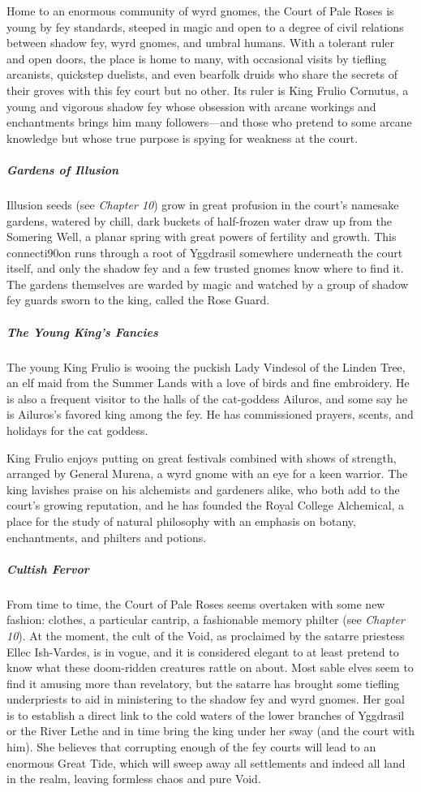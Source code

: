 \documentclass[10pt,a4paper,twoside,bg=print,twocolumn,openany,nodeprecatedcode]{dndbook}
\begin{document}
Home to an enormous community of wyrd gnomes, the Court of Pale Roses is young by fey standards, steeped in magic and open to a degree of civil relations between shadow fey, wyrd gnomes, and umbral humans. With a tolerant ruler and open doors, the place is home to many, with occasional visits by tiefling arcanists, quickstep duelists, and even bearfolk druids who share the secrets of their groves with this fey court but no other. Its ruler is King Frulio Cornutus, a young and vigorous shadow fey whose obsession with arcane workings and enchantments brings him many followers—and those who pretend to some arcane knowledge but whose true purpose is spying for weakness at the court.

\subparagraph{Gardens of Illusion}
Illusion seeds (see \textit{Chapter 10}) grow in great profusion in the court's namesake gardens, watered by chill, dark buckets of half-frozen water draw up from the Somering Well, a planar spring with great powers of fertility and growth. This connecti90on runs through a root of Yggdrasil somewhere underneath the court itself, and only the shadow fey and a few trusted gnomes know where to find it. The gardens themselves are warded by magic and watched by a group of shadow fey guards sworn to the king, called the Rose Guard.

\subparagraph{The Young King's Fancies}
The young King Frulio is wooing the puckish Lady Vindesol of the Linden Tree, an elf maid from the Summer Lands with a love of birds and fine embroidery. He is also a frequent visitor to the halls of the cat-goddess Ailuros, and some say he is Ailuros's favored king among the fey. He has commissioned prayers, scents, and holidays for the cat goddess.

King Frulio enjoys putting on great festivals combined with shows of strength, arranged by General Murena, a wyrd gnome with an eye for a keen warrior. The king lavishes praise on his alchemists and gardeners alike, who both add to the court's growing reputation, and he has founded the Royal College Alchemical, a place for the study of natural philosophy with an emphasis on botany, enchantments, and philters and potions.

\subparagraph{Cultish Fervor}
From time to time, the Court of Pale Roses seems overtaken with some new fashion: clothes, a particular cantrip, a fashionable memory philter (see \textit{Chapter 10}). At the moment, the cult of the Void, as proclaimed by the satarre priestess Ellec Ish-Vardes, is in vogue, and it is considered elegant to at least pretend to know what these doom-ridden creatures rattle on about. Most sable elves seem to find it amusing more than revelatory, but the satarre has brought some tiefling underpriests to aid in ministering to the shadow fey and wyrd gnomes. Her goal is to establish a direct link to the cold waters of the lower branches of Yggdrasil or the River Lethe and in time bring the king under her sway (and the court with him). She believes that corrupting enough of the fey courts will lead to an enormous Great Tide, which will sweep away all settlements and indeed all land in the realm, leaving formless chaos and pure Void.
\end{document}
